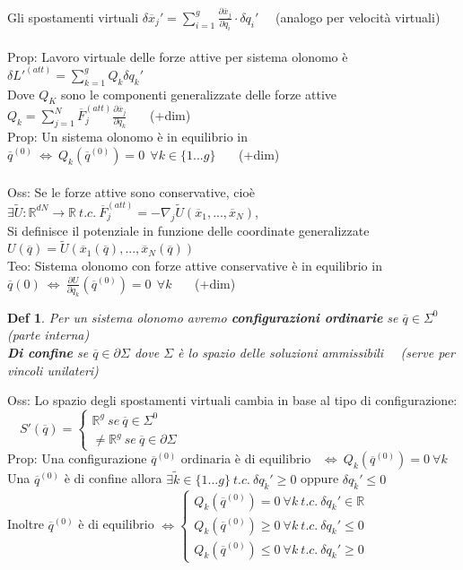\documentclass{article}
\theoremstyle{unnumbered}
\newtheorem* {theoremT}{Def}
\theoremstyle{unnumbered1}
\newenvironment{defi}{\begin{gBox}\begin{theoremT}}{\end{theoremT}\end{gBox}}
\begin{document}
Gli spostamenti virtuali  $ \delta \overline{x}_j' = \sum_{i=1}^g \frac{\partial \overline{x}_j}{\partial q_i}\cdot \delta q_i'$ \ \ (analogo per velocità virtuali)\\ \\
%
%
%
Prop: Lavoro virtuale delle forze attive per sistema olonomo è \ $\delta L'^{(att)}=\sum_{k=1}^gQ_k\delta q_k'$ \\ 
\phantom{Prop: }Dove $Q_K$ sono le componenti generalizzate delle forze attive \ \ $Q_k = \sum_{j=1}^N\overline{F}_j^{(att)}\frac{\partial\overline{x}_j}{\partial q_k}$ \ \ \ (+dim) \\
%
%
%
Prop: Un sistema olonomo è in equilibrio in $\overline{q}^{(0)} \ \Leftrightarrow \ Q_k(\overline{q}^{(0)})=0 \ \ \forall k \in \{1...g\}$ \ \ \ (+dim) \\ \\
%
%
%
Oss: Se le forze attive sono conservative, cioè $\exists \widetilde{U}:\mathbb{R}^{dN}\rightarrow\mathbb{R} \ t.c. \ \overline{F}_j^{(att)}=-\nabla_j\widetilde{U}(\overline{x}_1,...,\overline{x}_N)$, \\
\phantom{Oss: }Si definisce il potenziale in funzione delle coordinate generalizzate \ \ $U(\overline{q})=\widetilde{U}(\overline{x}_1(\overline{q}),...,\overline{x}_N(\overline{q}))$ \\
Teo: Sistema olonomo con forze attive conservative è in equilibrio in $\overline{q}(0) \ \Leftrightarrow \ \frac{\partial U}{\partial q_k}(\overline{q}^{(0)})=0 \ \ \forall k$ \ \ \ (+dim)\\
%
%
%
\begin{defi}
Per un sistema olonomo avremo \textbf{configurazioni ordinarie} se $\overline{q} \in \Sigma^0$ (parte interna) \\
\textbf{Di confine} se $\overline{q} \in \partial\Sigma$ dove $\Sigma$ è lo spazio delle soluzioni ammissibili \ \ (serve per vincoli unilateri)
\end{defi}
%
Oss: Lo spazio degli spostamenti virtuali cambia in base al tipo di configurazione: \ \ $S'(\overline{q}) = \begin{cases}\mathbb{R}^g \ se \ \overline{q} \in \Sigma^0 \\ \neq\mathbb{R}^g \ se \ \overline{q} \in \partial\Sigma \end{cases} $ \\
%
Prop: Una configurazione $\overline{q}^{(0)}$ ordinaria è di equilibrio \ $\Leftrightarrow \ Q_k(\overline{q}^{(0)})=0 \ \forall k$ \\
\phantom{Prop: }Una $\overline{q}^{(0)}$ è di confine allora $\exists \tilde{k} \in \{1...g\} \ t.c. \ \delta q_{\tilde{k}}'\geq 0$ oppure $\delta q_{\tilde{k}}'\leq 0$ \\
\phantom{Prop: }Inoltre $\overline{q}^{(0)}$ è di equilibrio $\Leftrightarrow \begin{cases}
Q_k(\overline{q}^{(0)})=0 \ \forall k \ t.c. \ \delta q_k' \in \mathbb{R} \\
Q_k(\overline{q}^{(0)})\geq 0 \ \forall k \ t.c. \ \delta q_k' \leq 0 \\
Q_k(\overline{q}^{(0)})\leq 0 \ \forall k \ t.c. \ \delta q_k' \geq 0
\end{cases}$ 
\end{document}
